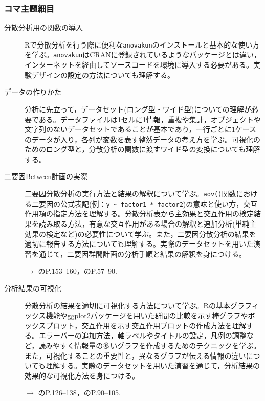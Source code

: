\subsubsection{コマ主題細目}
\begin{description}
	\item[分散分析用の関数の導入]
	Rで分散分析を行う際に便利な\verb|anovakun|のインストールと基本的な使い方を学ぶ。\verb|anovakun|はCRANに登録されているようなパッケージとは違い，インターネットを経由してソースコードを環境に導入する必要がある。実験デザインの設定の方法についても理解する。

	\item[データの作りかた] 分析に先立って，データセット(ロング型・ワイド型)についての理解が必要である。データファイルは1セルに1情報，重複や集計，オブジェクトや文字列のないデータセットであることが基本であり，一行ごとに1ケースのデータが入り，各列が変数を表す整然データの考え方を学ぶ。可視化のためのロング型と，分散分析の関数に渡すワイド型の変換についても理解する。

	\item[二要因Between計画の実際] 二要因分散分析の実行方法と結果の解釈について学ぶ。\verb|aov()|関数における二要因の公式表記(例：\verb|y ~ factor1 * factor2|)の意味と使い方，交互作用項の指定方法を理解する。分散分析表から主効果と交互作用の検定結果を読み取る方法，有意な交互作用がある場合の解釈と追加分析(単純主効果の検定など)の必要性について学ぶ。また，二要因分散分析の結果を適切に報告する方法についても理解する。実際のデータセットを用いた演習を通じて，二要因群間計画の分析手順と結果の解釈を身につける。
	      \begin{flushright}
		      $\to$ \textcite{kosugi2019}のP.153--160，\textcite{Hashimoto201607}のP.57--90.
	      \end{flushright}

	\item[分析結果の可視化] 分散分析の結果を適切に可視化する方法について学ぶ。Rの基本グラフィックス機能やggplot2パッケージを用いた群間の比較を示す棒グラフやボックスプロット，交互作用を示す交互作用プロットの作成方法を理解する。エラーバーの追加方法，軸ラベルやタイトルの設定，凡例の調整など，読みやすく情報量の多いグラフを作成するためのテクニックを学ぶ。また，可視化することの重要性と，異なるグラフが伝える情報の違いについても理解する。実際のデータセットを用いた演習を通じて，分析結果の効果的な可視化方法を身につける。
	      \begin{flushright}
		      $\to$ \textcite{Kinosady2021}のP.126--138，\textcite{kosugi2019}のP.90--105.
	      \end{flushright}

\end{description}
